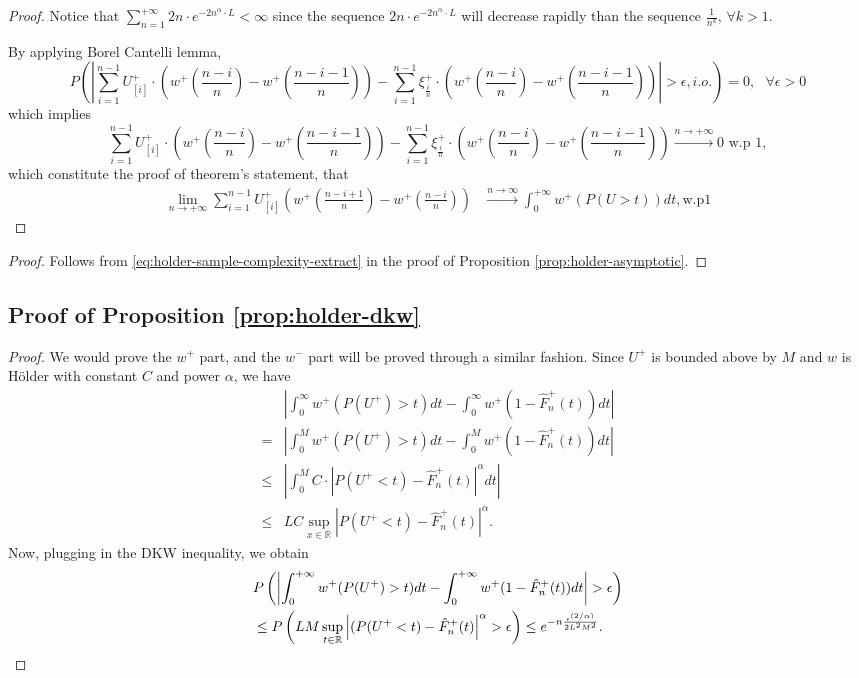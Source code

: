 \begin{proof}
Notice that $\sum_{n=1}^{+\infty}  2n \cdot e^{-2n^{\alpha}\cdot L}< \infty$ since the sequence 
$2n \cdot e^{-2n^{\alpha}\cdot L}$ will decrease rapidly than the sequence
$\frac{1}{n^k}$, $\forall k>1$.

By applying Borel Cantelli lemma,
$$
P ( \left| \sum_{i=1}^{n-1} U^+_{[i]} \cdot (w^+(\frac{n-i}{n} )  - w^+(\frac{n-i-1}{n} ) ) -
\sum_{i=1}^{n-1} \xi^+_{\frac{i}{n}} \cdot (w^+(\frac{n-i}{n} )  - w^+(\frac{n-i-1}{n} ) ) \right| >
\epsilon , i.o.) =0 , \text{   } \forall \epsilon >0 $$
which implies 
$$
\sum_{i=1}^{n-1} U^+_{[i]} \cdot (w^+(\frac{n-i}{n} )  - w^+(\frac{n-i-1}{n} ) ) - \sum_{i=1}^{n-1}
\xi^+_{\frac{i}{n}} \cdot (w^+(\frac{n-i}{n} )  - w^+(\frac{n-i-1}{n} ) ) \xrightarrow{n \rightarrow
+\infty} 0 \text{   w.p } 1 ,
$$
which constitute the proof of theorem's statement, that 
\begin{align}
\lim_{n\rightarrow +\infty} \sum_{i=1}^{n-1} U^+_{ [i ] } (w^+(\frac{n-i+1}{n})- w^+(\frac{n-i}{n}))
&\xrightarrow{n \rightarrow\infty} \int_0^{+\infty} w^+(P(U>t)) dt, \text{w.p} 1
\end{align}
\end{proof}






\begin{proof}
Follows from \eqref{eq:holder-sample-complexity-extract} in the proof of Proposition \ref{prop:holder-asymptotic}.
\end{proof}



\subsection*{Proof of Proposition \ref{prop:holder-dkw}}
\begin{proof}
We would prove the $w^+$ part, and the $w^-$ part will be proved through a similar fashion.
Since $U^+$ is bounded above by $M$ and $w$ is H\"{o}lder with constant $C$ and power $\alpha$, we have
\begin{align*}
&\left|\int_0^{\infty} w^+(P(U^+)>t) dt- \int_0^{\infty} w^+(1- {\hat F^+_n}(t)) dt\right| \\ = &
    \left|\int_0^M w^+(P(U^+)>t) dt- \int_0^M w^+(1- {\hat F^+_n}(t)) dt\right| \\
\leq& \left|\int_0^M C\cdot |P(U^+<t)-{\hat F^+_n}(t)|^\alpha dt\right|\\ \leq& LC\sup_{x\in
\mathbb{R}}\left|P(U^+<t)-{\hat F^+_n}(t)\right|^\alpha.
\end{align*}
Now, plugging in the DKW inequality, we obtain
\begin{align}
&
P\left(\left|\intinfinity w^+(P(U^+)>t) dt- \intinfinity w^+(1- {\hat F^+_n}(t)) dt\right|>\epsilon\right)
\nonumber\\
& \leq P\left(LM\sup_{t\in \mathbb{R}} \left|(P(U^+<t)-{\hat F^+_n}(t)\right|^\alpha>\epsilon\right)
\leq  e^{-n \frac{\epsilon ^{(2/\alpha)}} {2 L^2 M^2}}.\label{eq:dkw3}
\end{align}
\end{proof}


